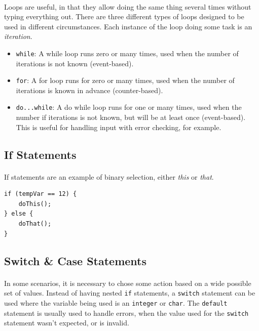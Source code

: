 \documentclass[letter,11pt]{article}
\begin{document}
\paragraph{}Loops are useful, in that they allow doing the same thing several times without typing everything out. There are three different types of loops designed to be used in different circumstances. Each instance of the loop doing some task is an \textit{iteration}.
\begin{itemize}
    \item \texttt{while}: A while loop runs zero or many times, used when the number of iterations is not known (event-based).
    \item \texttt{for}: A for loop runs for zero or many times, used when the number of iterations is known in advance (counter-based).
    \item \texttt{do...while}: A do while loop runs for one or many times, used when the number if iterations is not known, but will be at least once (event-based). This is useful for handling input with error checking, for example.
\end{itemize}

\subsection{If Statements}
\paragraph{}If statements are an example of binary selection, either \textit{this} or \textit{that}.
\begin{verbatim}
if (tempVar == 12) {
    doThis();
} else {
    doThat();
}
\end{verbatim}

\subsection{Switch \& Case Statements}
\paragraph{}In some scenarios, it is necessary to chose some action based on a wide possible set of values. Instead of having nested \texttt{if} statements, a \texttt{switch} statement can be used where the variable being used is an \texttt{integer} or \texttt{char}. The \texttt{default} statement is usually used to handle errors, when the value used for the \texttt{switch} statement wasn't expected, or is invalid.
\end{document}
